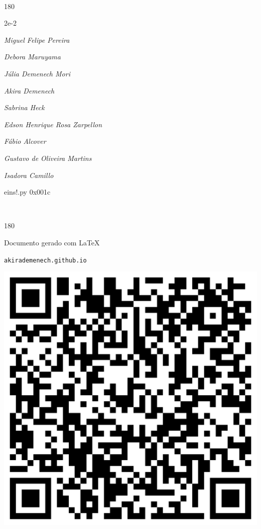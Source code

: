 \documentclass[12pt]{article}
\begin{document}
	\ 
	\vfill
	\begin{turn}{180}	
		\begin{minipage}{\textwidth}
		  	\ttfamily %
			\centering
			{\Huge 2e-2}
		  
			\hfill
		  
			

\textit{\small Miguel Felipe Pereira}

\textit{\small Debora Maruyama}

\textit{\small Júlia Demenech Mori}

\textit{\small Akira Demenech}

\textit{\small Sabrina Heck}

\textit{\small Edson Henrique Rosa Zarpellon}

\textit{\small Fábio Alcover}

\textit{\small Gustavo de Oliveira Martins}

\textit{\small Isadora Camillo}

\bigskip

eins!.py
0x001c


		\end{minipage}	
	\end{turn}
	\vfill
	\

\pagebreak

	\begin{turn}{180}	
		\begin{minipage}{\textwidth}		  
		  Documento gerado com \LaTeX			
		  
		  \texttt{akirademenech.github.io}

		  \includegraphics[height=0.3\textheight]{2e-2.pdf}

		\end{minipage}	
	\end{turn}  
		  
\end{document}
